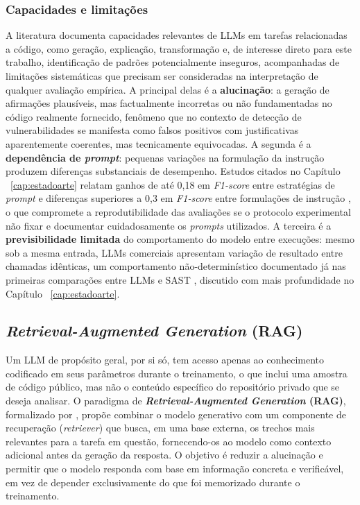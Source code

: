 \subsubsection{Capacidades e limitações}\label{subsubsec:llms-capacidades-limitacoes}
A literatura documenta capacidades relevantes de LLMs em tarefas relacionadas a código, como geração, explicação, transformação e, de interesse direto para este trabalho, identificação de padrões potencialmente inseguros, acompanhadas de limitações sistemáticas que precisam ser consideradas na interpretação de qualquer avaliação empírica. A principal delas é a \textbf{alucinação}: a geração de afirmações plausíveis, mas factualmente incorretas ou não fundamentadas no código realmente fornecido, fenômeno que no contexto de detecção de vulnerabilidades se manifesta como falsos positivos com justificativas aparentemente coerentes, mas tecnicamente equivocadas. A segunda é a \textbf{dependência de \textit{prompt}}: pequenas variações na formulação da instrução produzem diferenças substanciais de desempenho. Estudos citados no Capítulo ~\ref{cap:estadoarte} relatam ganhos de até 0,18 em \textit{F1-score} entre estratégias de \textit{prompt} \cite{Khare2025LLMEffectiveness} e diferenças superiores a 0,3 em \textit{F1-score} entre formulações de instrução \cite{Iranmanesh2025ZeroFalse}, o que compromete a reprodutibilidade das avaliações se o protocolo experimental não fixar e documentar cuidadosamente os \textit{prompts} utilizados. A terceira é a \textbf{previsibilidade limitada} do comportamento do modelo entre execuções: mesmo sob a mesma entrada, LLMs comerciais apresentam variação de resultado entre chamadas idênticas, um comportamento não-determinístico documentado já nas primeiras comparações entre LLMs e SAST \cite{Ozturk2023AIvsSAST}, discutido com mais profundidade no Capítulo ~\ref{cap:estadoarte}.

\subsection{\textit{Retrieval-Augmented Generation} (RAG)}\label{subsec:rag}
Um LLM de propósito geral, por si só, tem acesso apenas ao conhecimento codificado em seus parâmetros durante o treinamento, o que inclui uma amostra de código público, mas não o conteúdo específico do repositório privado que se deseja analisar. O paradigma de \textbf{\textit{Retrieval-Augmented Generation} (RAG)}, formalizado por , propõe combinar o modelo generativo com um componente de recuperação (\textit{retriever}) que busca, em uma base externa, os trechos mais relevantes para a tarefa em questão, fornecendo-os ao modelo como contexto adicional antes da geração da resposta. O objetivo é reduzir a alucinação e permitir que o modelo responda com base em informação concreta e verificável, em vez de depender exclusivamente do que foi memorizado durante o treinamento.

